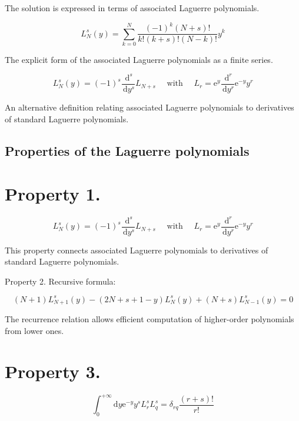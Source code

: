 \documentclass[italian]{HKNdocument}
\begin{document}
The solution is expressed in terms of associated Laguerre polynomials.

\begin{equation}
L_{N}^{s}(y)=\sum_{k=0}^{N} \frac{(-1)^{k}(N+s)!}{k!(k+s)!(N-k)!} y^{k}
\end{equation}

The explicit form of the associated Laguerre polynomials as a finite series.

\begin{equation}
L_{N}^{s}(y)=(-1)^{s} \frac{\, \mathrm{d}^{s}}{\, \mathrm{d} y^{s}} L_{N+s} \quad \text { with } \quad L_{r}=\mathrm{e}^{y} \frac{\, \mathrm{d}^{r}}{\, \mathrm{d} y^{r}} \mathrm{e}^{-y} y^{r}
\end{equation}

An alternative definition relating associated Laguerre polynomials to derivatives of standard Laguerre polynomials.

\subsection{Properties of the Laguerre polynomials}
\section{Property 1.}

\begin{equation}
L_{N}^{s}(y)=(-1)^{s} \frac{\, \mathrm{d}^{s}}{\, \mathrm{d} y^{s}} L_{N+s} \quad \text { with } \quad L_{r}=\mathrm{e}^{y} \frac{\, \mathrm{d}^{r}}{\, \mathrm{d} y^{r}} \mathrm{e}^{-y} y^{r}
\end{equation}

This property connects associated Laguerre polynomials to derivatives of standard Laguerre polynomials.

Property 2. Recursive formula:

\begin{equation}
(N+1) L_{N+1}^{s}(y)-(2 N+s+1-y) L_{N}^{s}(y)+(N+s) L_{N-1}^{s}(y)=0
\end{equation}

The recurrence relation allows efficient computation of higher-order polynomials from lower ones.

\section{Property 3.}

\begin{equation}
\int_{0}^{+\infty} \mathrm{d} y \mathrm{e}^{-y} y^{s} L_{r}^{s} L_{q}^{s}=\delta_{r q} \frac{(r+s)!}{r!}
\end{equation}
\end{document}
